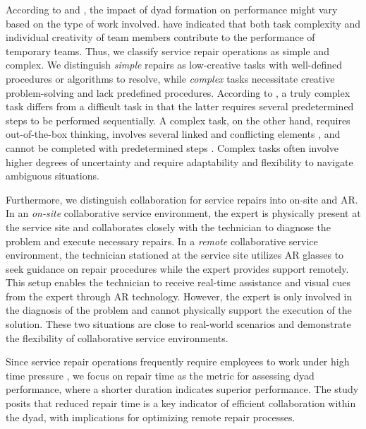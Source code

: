 \documentclass[msom,nonblindrev]{01 latex/class/informs3}
\begin{document}
According to \citet{harrison2003time} and \citet{espinosa2007familiarity}, the impact of dyad formation on performance might vary based on the type of work involved. \citet{chae2015effects} have indicated that both task complexity and individual creativity of team members contribute to the performance of temporary teams. Thus, we classify service repair operations as simple and complex. We distinguish \emph{simple} repairs as low-creative tasks with well-defined procedures or algorithms to resolve, while \emph{complex} tasks necessitate creative problem-solving and lack predefined procedures. According to \citet{wuttke2022seeing}, a truly complex task differs from a difficult task in that the latter requires several predetermined steps to be performed sequentially. A complex task, on the other hand, requires out-of-the-box thinking, involves several linked and conflicting elements \citep{campbell1988task}, and cannot be completed with predetermined steps \citep{liu2012task}. Complex tasks often involve higher degrees of uncertainty and require adaptability and flexibility to navigate ambiguous situations.

Furthermore, we distinguish collaboration for service repairs into on-site and AR. In an \emph{on-site} collaborative service environment, the expert is physically present at the service site and collaborates closely with the technician to diagnose the problem and execute necessary repairs. In a \emph{remote} collaborative service environment, the technician stationed at the service site utilizes AR glasses to seek guidance on repair procedures while the expert provides support remotely. This setup enables the technician to receive real-time assistance and visual cues from the expert through AR technology. However, the expert is only involved in the diagnosis of the problem and cannot physically support the execution of the solution. These two situations are close to real-world scenarios and demonstrate the flexibility of collaborative service environments.

Since service repair operations frequently require employees to work under high time pressure \citep{de2010augmented}, we focus on repair time as the metric for assessing dyad performance, where a shorter duration indicates superior performance. The study posits that reduced repair time is a key indicator of efficient collaboration within the dyad, with implications for optimizing remote repair processes.
\end{document}
